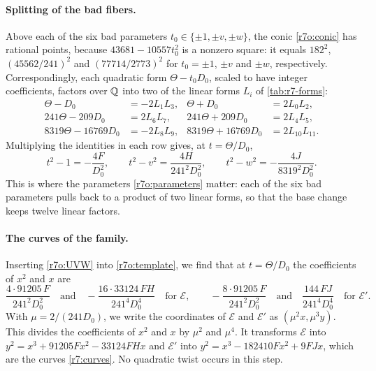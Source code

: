 \paragraph{Splitting of the bad fibers.} Above each of the six bad
parameters $t_0\in\{\pm1,\pm v,\pm w\}$, the conic \eqref{r7o:conic} has
rational points, because $43681-10557t_0^2$ is a nonzero square: it equals
$182^2$, $(45562/241)^2$ and $(77714/2773)^2$ for $t_0=\pm1$, $\pm v$ and
$\pm w$, respectively. Correspondingly, each quadratic form $\Theta-t_0D_0$,
scaled to have integer coefficients, factors over $\mathbb Q$ into two of the
linear forms $L_i$ of \cref{tab:r7-forms}:
\begin{equation}\label{r7o:pullbacks}
\begin{aligned}
 \Theta-D_0&=-2L_1L_3, & \Theta+D_0&=2L_0L_2,\\
 241\Theta-209D_0&=2L_6L_7, & 241\Theta+209D_0&=2L_4L_5,\\
 8319\Theta-16769D_0&=-2L_8L_9, & 8319\Theta+16769D_0&=2L_{10}L_{11}.
\end{aligned}
\end{equation}
Multiplying the identities in each row gives, at $t=\Theta/D_0$,
\begin{equation}\label{r7o:UVW}
 t^2-1=-\frac{4F}{D_0^2},\qquad t^2-v^2=\frac{4H}{241^2D_0^2},\qquad
 t^2-w^2=-\frac{4J}{8319^2D_0^2}.
\end{equation}
This is where the parameters \eqref{r7o:parameters} matter: each of the six
bad parameters pulls back to a product of two linear forms, so that the
base change keeps twelve linear factors.

\paragraph{The curves of the family.} Inserting \eqref{r7o:UVW} into
\eqref{r7o:template}, we find that at $t=\Theta/D_0$ the coefficients of
$x^2$ and $x$ are
\[
 \frac{4\cdot91205\,F}{241^2D_0^2}\quad\text{and}\quad
 -\frac{16\cdot33124\,FH}{241^4D_0^4}\quad\text{for }\mathcal E,\qquad
 -\frac{8\cdot91205\,F}{241^2D_0^2}\quad\text{and}\quad
 \frac{144\,FJ}{241^4D_0^4}\quad\text{for }\mathcal E'.
\]
With $\mu=2/(241D_0)$, we write the coordinates of $\mathcal E$ and
$\mathcal E'$ as $(\mu^2x,\mu^3y)$. This divides the coefficients of $x^2$
and $x$ by $\mu^2$ and $\mu^4$. It transforms $\mathcal E$ into
$y^2=x^3+91205Fx^2-33124FHx$ and $\mathcal E'$ into
$y^2=x^3-182410Fx^2+9FJx$, which are the curves \eqref{r7:curves}. No
quadratic twist occurs in this step.

